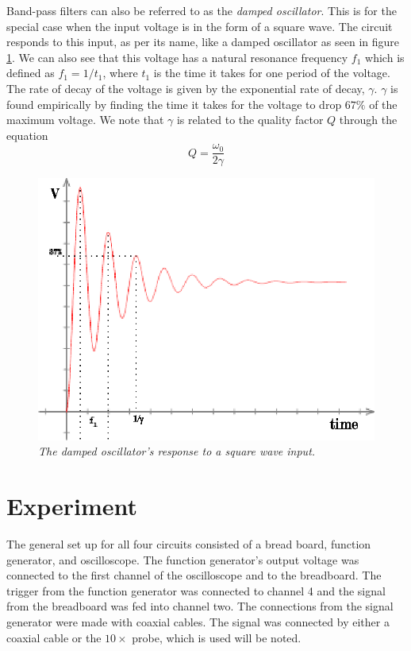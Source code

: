 \documentclass[11pt]{article}
\numberwithin{equation}{section}
\numberwithin{figure}{section}
\numberwithin{table}{section}
\begin{document}
Band-pass filters can also be referred to as the \emph{damped oscillator}. This is for the special case when the input voltage is in the form of a square wave. The circuit responds to this input, as per its name, like a damped oscillator as seen in figure \ref{DampOsc}. We can also see that this voltage has a natural resonance frequency $f_1$ which is defined as $f_1 = 1/t_1$, where $t_1$ is the time it takes for one period of the voltage. The rate of decay of the voltage is given by the exponential rate of decay, $\gamma$. $\gamma$ is found empirically by finding the time it takes for the voltage to drop $67\%$ of the maximum voltage. We note that $\gamma$ is related to the quality factor $Q$ through the equation
\begin{equation}
Q = \frac{\omega_0}{2\gamma}
\label{QualGamma}
\end{equation}

\begin{figure}[h]
\centering
\includegraphics[scale=1.0]{DampOsc.eps}
\caption{\textit{The damped oscillator's response to a square wave input.}}
\label{DampOsc}
\end{figure}



\section{Experiment}
The general set up for all four circuits consisted of a bread board, function generator, and oscilloscope. The function generator's output voltage was connected to the first channel of the oscilloscope and to the breadboard. The trigger from the function generator was connected to channel 4 and the signal from the breadboard was fed into channel two. The connections from the signal generator were made with coaxial cables. The signal was connected by either a coaxial cable or the $10\times$ probe, which is used will be noted.
\end{document}
